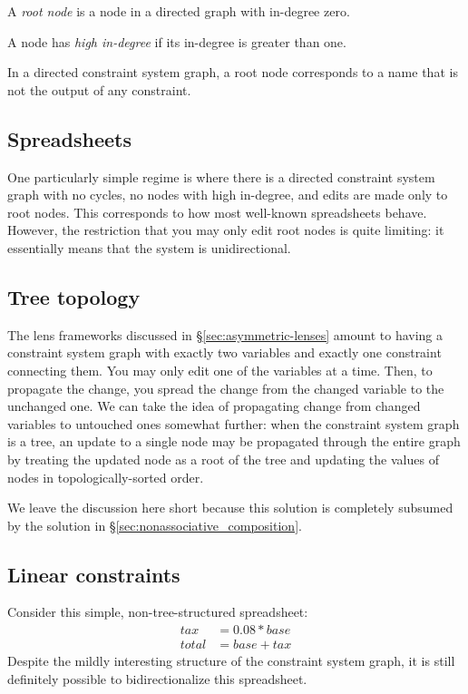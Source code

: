 \begin{definition}
    A \emph{root node} is a node in a directed graph with in-degree zero.
\end{definition}

\begin{definition}
    A node has \emph{high in-degree} if its in-degree is greater than one.
\end{definition}

In a directed constraint system graph, a root node corresponds to a name
that is not the output of any constraint.

\subsection{Spreadsheets}
One particularly simple regime is where there is a directed constraint
system graph with no cycles, no nodes with high in-degree, and edits are
made only to root nodes. This corresponds to how most well-known
spreadsheets behave. However, the restriction that you may only edit root
nodes is quite limiting: it essentially means that the system is
unidirectional.

\subsection{Tree topology}
The lens frameworks discussed in \S\ref{sec:asymmetric-lenses} amount to having a
constraint system graph with exactly two variables and exactly one
constraint connecting them. You may only edit one of the variables at a
time. Then, to propagate the change, you spread the change from the changed
variable to the unchanged one.
%
We can take the idea of propagating change from changed variables to
untouched ones somewhat further: when the constraint system graph is a tree, an
update to a single node may be propagated through the entire graph by
treating the updated node as a root of the tree and updating the values of
nodes in topologically-sorted order.

We leave the discussion here short because this solution is completely
subsumed by the solution in \S\ref{sec:nonassociative_composition}.

\subsection{Linear constraints}
\label{sec:linear_constraints}
Consider this simple, non-tree-structured spreadsheet:
\begin{align*}
    tax &= 0.08*base \\
    total &= base + tax
\end{align*}
Despite the mildly interesting structure of the constraint system graph, it
is still definitely possible to bidirectionalize this spreadsheet.

